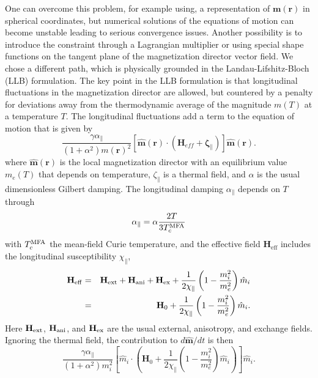 \documentclass[%
 reprint,
superscriptaddress,
 amsmath,amssymb,
prb,
]{revtex4-1}
\begin{document}
%
One can overcome this problem, for example using, a representation of ${\mathbf m}({\mathbf r})$ in spherical coordinates\cite{Yi2014}, but numerical solutions of the equations of motion can become unstable leading to serious convergence issues. Another possibility is to introduce the constraint through a Lagrangian multiplier or using special shape functions on the tangent plane of the magnetization director vector field\cite{alouges2006convergence,szambolics}. We chose a different path, which is physically grounded in the Landau-Lifshitz-Bloch (LLB) formulation\cite{garanin1997,Garanin2004,evans2012}.
%
The key point in the LLB formulation is that longitudinal fluctuations in the magnetization director are allowed, but countered by a penalty for deviations away from the thermodynamic average of the magnitude $m(T)$ at a temperature $T$. The longitudinal fluctuations add a term to the equation of motion that is given by 
%
\begin{equation}
    \frac{\gamma\alpha_\parallel}{(1+\alpha^2)m({\mathbf r})^2}\left[\hat{\mathbf{m}}({\mathbf r})\cdot\left(\mathbf{H}_{eff}+\mathbf{\zeta}_\parallel\right)
    \right]\hat{\mathbf{m}}({\mathbf r}).
\end{equation}
%
where $\hat{\mathbf{m}}({\mathbf r})$ is the local magnetization director with an  equilibrium value $m_e(T)$ that depends on temperature, $\zeta_\parallel$ is a thermal field, and $\alpha$ is the usual dimensionless Gilbert damping.  
The longitudinal damping $\alpha_\parallel$ depends on $T$ through
\begin{equation}
    \alpha_\parallel=\alpha\frac{2T}{3T^{\rm MFA}_c}
\end{equation}
with $T^{\rm MFA}_c$ the mean-field Curie temperature, 
and the effective field $\mathbf{H}_\mathrm{eff}$ includes the longitudinal susceptibility $\chi_\parallel$,
\begin{eqnarray}
    \mathbf{H}_{\rm eff} & = &\mathbf{H}_{\rm ext}+\mathbf{H}_{\rm ani}+\mathbf{H}_{\rm ex}+
    \frac{1}{2\chi_\parallel}\left(1-\frac{m_i^2}{m_e^2}\right)\hat m_i\nonumber\\
   &  = &\mathbf{H}_0+\frac{1}{2\chi_\parallel}\left(1-\frac{m_i^2}{m_e^2}\right)\hat m_i.
\end{eqnarray}
Here $\mathbf{H}_{\rm ext}$, $\mathbf{H}_{\rm ani}$, and $\mathbf{H}_{\rm ex}$ are the usual external, anisotropy, and exchange fields. Ignoring the thermal field, the contribution to $d\hat{\mathbf{m}}/dt$ is then
\begin{equation}
    \frac{\gamma\alpha_\parallel}{(1+\alpha^2)m_i^2}
    \left[
    \hat m_i\cdot\left(\mathbf{H}_0+\frac{1}{2\chi_\parallel}(1-\frac{m_i^2}{m_e^2})\hat m_i\right) \right]\hat m_i.
\end{equation}
\end{document}
